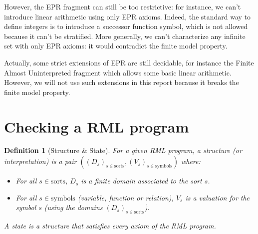 \documentclass[11pt,a4paper,oldfontcommands,openany]{memoir}
\newtheorem*{definition}{Definition}
\begin{document}
        However, the EPR fragment can still be too restrictive: for instance, we can't introduce linear arithmetic using only EPR axioms.
        Indeed, the standard way to define integers is to introduce a successor function symbol, which is not allowed because it can't be stratified.
        More generally, we can't characterize any infinite set with only EPR axioms: it would contradict the finite model property.

        Actually, some strict extensions of EPR are still decidable, for instance the Finite Almost Uninterpreted fragment\cite{Taube:2018:MDD:3192366.3192414} which allows
        some basic linear arithmetic. However, we will not use such extensions in this report because it breaks the finite model property.


    
    \section{Checking a RML program}

    \begin{definition}[Structure \& State]
        For a given RML program, a structure (or interpretation) is a pair \(((D_s)_{s\in \text{sorts}}, (V_s)_{s\in \text{symbols}})\) where:
        \begin{itemize}
            \item For all \(s \in \text{sorts}\), \(D_s\) is a finite domain associated to the sort \(s\).
            \item For all \(s \in \text{symbols}\) (variable, function or relation), \(V_s\) is a valuation for the symbol \(s\) (using the domains \((D_s)_{s\in \text{sorts}}\)).
        \end{itemize}
        A state is a structure that satisfies every axiom of the RML program.
    \end{definition}
\end{document}
